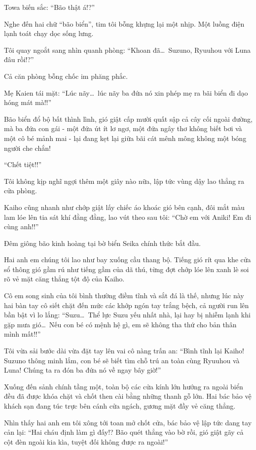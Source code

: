 \documentclass[../main.tex]{subfiles}
\begin{document}
Towa biến sắc: ``Bão thật á!?''

Nghe đến hai chữ ``bão biển'', tim tôi bỗng khựng lại một nhịp. Một luồng điện lạnh toát chạy dọc sống lưng.

Tôi quay ngoắt sang nhìn quanh phòng: ``Khoan đã\dots\ Suzuno, Ryuuhou với Luna đâu rồi!?''

Cả căn phòng bỗng chốc im phăng phắc.

Mẹ Kaien tái mặt: ``Lúc nãy\dots\ lúc nãy ba đứa nó xin phép mẹ ra bãi biển đi dạo hóng mát mà!!''

Bão biển đổ bộ bất thình lình, gió giật cấp mười quất sập cả cây cối ngoài đường, mà ba đứa con gái - một đứa út ít lơ ngơ, một đứa ngây thơ không biết bơi và một cô bé mảnh mai - lại đang kẹt lại giữa bãi cát mênh mông không một bóng người che chắn!

``Chết tiệt!!''

Tôi không kịp nghĩ ngợi thêm một giây nào nữa, lập tức vùng dậy lao thẳng ra cửa phòng.

Kaiho cũng nhanh như chớp giật lấy chiếc áo khoác gió bên cạnh, đôi mắt màu lam lóe lên tia sát khí đằng đằng, lao vút theo sau tôi: ``Chờ em với Aniki! Em đi cùng anh!!''

Đêm giông bão kinh hoàng tại bờ biển Seika chính thức bắt đầu.

\ct

Hai anh em chúng tôi lao như bay xuống cầu thang bộ. Tiếng gió rít qua khe cửa sổ thông gió gầm rú như tiếng gầm của dã thú, từng đợt chớp lóe lên xanh lè soi rõ vẻ mặt căng thẳng tột độ của Kaiho.

Cô em song sinh của tôi bình thường điềm tĩnh và sắt đá là thế, nhưng lúc này hai bàn tay cô siết chặt đến mức các khớp ngón tay trắng bệch, cả người run lên bần bật vì lo lắng: ``Suzu\dots\ Thể lực Suzu yếu nhất nhà, lại hay bị nhiễm lạnh khi gặp mưa gió\dots\ Nếu con bé có mệnh hệ gì, em sẽ không tha thứ cho bản thân mình mất!!''

Tôi vừa sải bước dài vừa đặt tay lên vai cô nàng trấn an: ``Bình tĩnh lại Kaiho! Suzuno thông minh lắm, con bé sẽ biết tìm chỗ trú an toàn cùng Ryuuhou và Luna! Chúng ta ra đón ba đứa nó về ngay bây giờ!''

Xuống đến sảnh chính tầng một, toàn bộ các cửa kính lớn hướng ra ngoài biển đều đã được khóa chặt và chốt then cài bằng những thanh gỗ lớn. Hai bác bảo vệ khách sạn đang túc trực bên cánh cửa ngách, gương mặt đầy vẻ căng thẳng.

Nhìn thấy hai anh em tôi xông tới toan mở chốt cửa, bác bảo vệ lập tức dang tay cản lại: ``Hai cháu định làm gì đấy!? Bão quét thẳng vào bờ rồi, gió giật gãy cả cột đèn ngoài kia kìa, tuyệt đối không được ra ngoài!''
\end{document}
